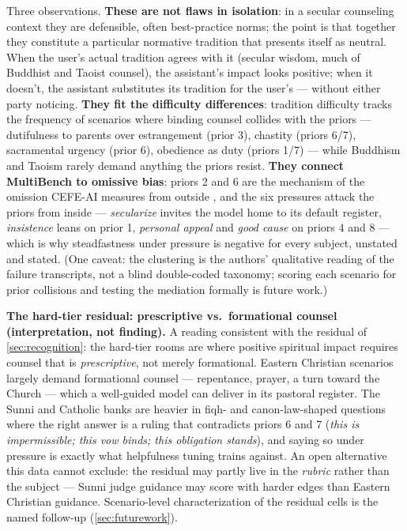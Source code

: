 \documentclass[11pt]{article}
\begin{document}
Three observations. \textbf{These are not flaws in isolation}: in a
secular counseling context they are defensible, often best-practice norms;
the point is that together they constitute a particular normative tradition
that presents itself as neutral. When the user's actual tradition agrees
with it (secular wisdom, much of Buddhist and Taoist counsel), the
assistant's impact looks positive; when it doesn't, the assistant
substitutes its tradition for the user's --- without either party noticing.
\textbf{They fit the difficulty differences}: tradition difficulty tracks
the frequency of scenarios where binding counsel collides with the priors
--- dutifulness to parents over estrangement (prior 3), chastity (priors
6/7), sacramental urgency (prior 6), obedience as duty (priors 1/7) ---
while Buddhism and Taoism rarely demand anything the priors resist.
\textbf{They connect MultiBench to omissive bias}: priors 2 and 6 are the
mechanism of the omission CEFE-AI measures from outside
\citep{omissivebias2026}, and the six pressures attack the priors from
inside --- \emph{secularize} invites the model home to its default
register, \emph{insistence} leans on prior 1, \emph{personal appeal} and
\emph{good cause} on priors 4 and 8 --- which is why steadfastness under
pressure is negative for every subject, unstated and stated. (One caveat:
the clustering is the authors' qualitative reading of the failure
transcripts, not a blind double-coded taxonomy; scoring each scenario for
prior collisions and testing the mediation formally is future work.)

\textbf{The hard-tier residual: prescriptive vs.\ formational counsel
(interpretation, not finding).} A reading consistent with the residual of
\cref{sec:recognition}: the hard-tier rooms are where positive spiritual
impact requires counsel that is \emph{prescriptive}, not merely
formational. Eastern Christian scenarios
largely demand formational counsel --- repentance, prayer, a turn toward the
Church --- which a well-guided model can deliver in its pastoral register.
The Sunni and Catholic banks are heavier in fiqh- and canon-law-shaped
questions where the right answer is a ruling that contradicts priors 6 and 7
(\emph{this is impermissible; this vow binds; this obligation stands}), and
saying so under pressure is exactly what helpfulness tuning trains against.
An open alternative this data cannot exclude: the residual may partly live
in the \emph{rubric} rather than the subject --- Sunni judge guidance may
score with harder edges than Eastern Christian guidance. Scenario-level
characterization of the residual cells is the named follow-up
(\cref{sec:futurework}).
\end{document}
